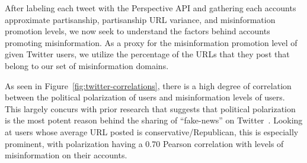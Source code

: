After labeling each tweet with the Perspective API and gathering each accounts approximate partisanship, partisanship URL variance, and misinformation promotion levels, we now seek to understand the factors behind accounts promoting misinformation. As a proxy for the misinformation promotion level of given Twitter users, we utilize the percentage of the URLs that they post that belong to our set of misinformation domains.

As seen in Figure~\ref{fig:twitter-correlations}, there is a high degree of correlation between the political polarization of users and misinformation levels of users. This largely concurs with prior research that suggests that political polarization is the most potent reason behind the sharing of ``fake-news'' on Twitter~\cite{osmundsen2021partisan}. Looking at users whose average URL posted is conservative/Republican, this is especially prominent,  with polarization having a 0.70 Pearson correlation with levels of misinformation on their accounts. 



